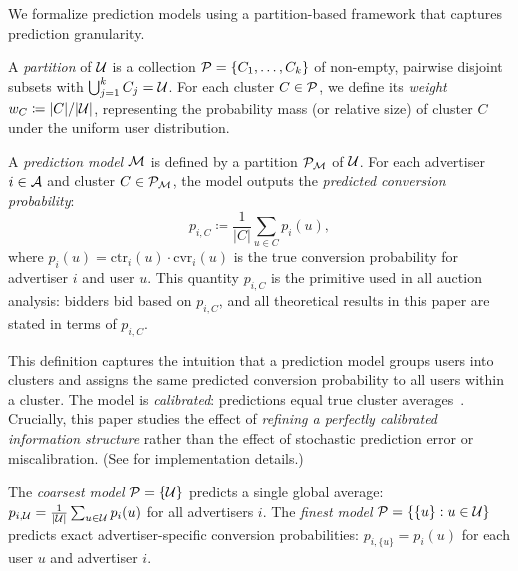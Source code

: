 We formalize prediction models using a partition-based framework that captures prediction granularity.

\begin{definition}
\label{def:partition}
A \emph{partition} of $\mathcal{U}$ is a collection $\mathcal{P} = \{C_1, \ldots, C_k\}$ of non-empty, pairwise disjoint subsets with $\bigcup_{j=1}^{k} C_j = \mathcal{U}$. For each cluster $C \in \mathcal{P}$, we define its \emph{weight} $w_C \coloneqq |C|/|\mathcal{U}|$, representing the probability mass (or relative size) of cluster $C$ under the uniform user distribution.
\end{definition}

\begin{definition}
\label{def:prediction_model}
A \emph{prediction model} $\mathcal{M}$ is defined by a partition $\mathcal{P}_{\mathcal{M}}$ of $\mathcal{U}$. For each advertiser $i \in \mathcal{A}$ and cluster $C \in \mathcal{P}_{\mathcal{M}}$, the model outputs the \emph{predicted conversion probability}:
\begin{equation}
\label{eq:p_iC_def}
p_{i,C} \coloneqq \frac{1}{|C|} \sum_{u \in C} p_i(u),
\end{equation}
where $p_i(u) = \mathrm{ctr}_i(u) \cdot \mathrm{cvr}_i(u)$ is the true conversion probability for advertiser $i$ and user $u$. This quantity $p_{i,C}$ is the primitive used in all auction analysis: bidders bid based on $p_{i,C}$, and all theoretical results in this paper are stated in terms of $p_{i,C}$.
\end{definition}

This definition captures the intuition that a prediction model groups users into clusters and assigns the same predicted conversion probability to all users within a cluster. The model is \emph{calibrated}: predictions equal true cluster averages~\citep{ma2018entire,gneiting2007probabilistic}. Crucially, this paper studies the effect of \emph{refining a perfectly calibrated information structure} rather than the effect of stochastic prediction error or miscalibration. (See  for implementation details.)

\begin{example}
\label{ex:extreme_models}
The \emph{coarsest model} $\mathcal{P} = \{\mathcal{U}\}$ predicts a single global average: $p_{i,\mathcal{U}} = \frac{1}{|\mathcal{U}|} \sum_{u \in \mathcal{U}} p_i(u)$ for all advertisers $i$. The \emph{finest model} $\mathcal{P} = \{\{u\} : u \in \mathcal{U}\}$ predicts exact advertiser-specific conversion probabilities: $p_{i,\{u\}} = p_i(u)$ for each user $u$ and advertiser $i$.
\end{example}

